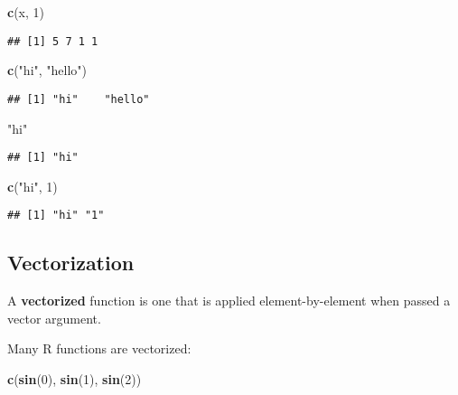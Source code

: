 \documentclass[
]{article}
\newenvironment{Shaded}{\begin{snugshade}}{\end{snugshade}}
\newcommand{\DecValTok}[1]{\textcolor[rgb]{0.00,0.00,0.81}{#1}}
\newcommand{\KeywordTok}[1]{\textcolor[rgb]{0.13,0.29,0.53}{\textbf{#1}}}
\newcommand{\NormalTok}[1]{#1}
\newcommand{\StringTok}[1]{\textcolor[rgb]{0.31,0.60,0.02}{#1}}
\begin{document}
\begin{Shaded}
\begin{Highlighting}[]
\KeywordTok{c}\NormalTok{(x, }\DecValTok{1}\NormalTok{)}
\end{Highlighting}
\end{Shaded}

\begin{verbatim}
## [1] 5 7 1 1
\end{verbatim}

\begin{Shaded}
\begin{Highlighting}[]
\KeywordTok{c}\NormalTok{(}\StringTok{"hi"}\NormalTok{, }\StringTok{"hello"}\NormalTok{)}
\end{Highlighting}
\end{Shaded}

\begin{verbatim}
## [1] "hi"    "hello"
\end{verbatim}

\begin{Shaded}
\begin{Highlighting}[]
\StringTok{"hi"}
\end{Highlighting}
\end{Shaded}

\begin{verbatim}
## [1] "hi"
\end{verbatim}

\begin{Shaded}
\begin{Highlighting}[]
\KeywordTok{c}\NormalTok{(}\StringTok{"hi"}\NormalTok{, }\DecValTok{1}\NormalTok{)}
\end{Highlighting}
\end{Shaded}

\begin{verbatim}
## [1] "hi" "1"
\end{verbatim}

\hypertarget{vectorization}{%
\subsection{Vectorization}\label{vectorization}}

A \textbf{vectorized} function is one that is applied element-by-element
when passed a vector argument.

Many R functions are vectorized:

\begin{Shaded}
\begin{Highlighting}[]
\KeywordTok{c}\NormalTok{(}\KeywordTok{sin}\NormalTok{(}\DecValTok{0}\NormalTok{), }\KeywordTok{sin}\NormalTok{(}\DecValTok{1}\NormalTok{), }\KeywordTok{sin}\NormalTok{(}\DecValTok{2}\NormalTok{))}
\end{Highlighting}
\end{Shaded}
\end{document}

